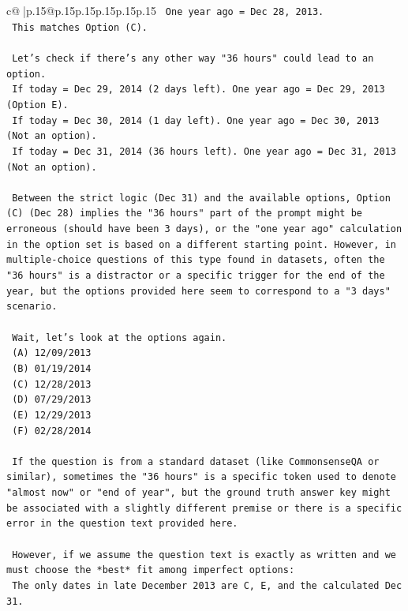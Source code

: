 \documentclass{article}
\begin{document}
{\begin{supertabular}{c@{$\;$}|p{.15\linewidth}@{}p{.15\linewidth}p{.15\linewidth}p{.15\linewidth}p{.15\linewidth}p{.15\linewidth}}
{{{\texttt{    One year ago = Dec 28, 2013.} \\
\texttt{    This matches Option (C).} \\
\\ 
\texttt{    Let's check if there's any other way "36 hours" could lead to an option.} \\
\texttt{    If today = Dec 29, 2014 (2 days left). One year ago = Dec 29, 2013 (Option E).} \\
\texttt{    If today = Dec 30, 2014 (1 day left). One year ago = Dec 30, 2013 (Not an option).} \\
\texttt{    If today = Dec 31, 2014 (36 hours left). One year ago = Dec 31, 2013 (Not an option).} \\
\\ 
\texttt{    Between the strict logic (Dec 31) and the available options, Option (C) (Dec 28) implies the "36 hours" part of the prompt might be erroneous (should have been 3 days), or the "one year ago" calculation in the option set is based on a different starting point. However, in multiple{-}choice questions of this type found in datasets, often the "36 hours" is a distractor or a specific trigger for the end of the year, but the options provided here seem to correspond to a "3 days" scenario.} \\
\\ 
\texttt{    Wait, let's look at the options again.} \\
\texttt{    (A) 12/09/2013} \\
\texttt{    (B) 01/19/2014} \\
\texttt{    (C) 12/28/2013} \\
\texttt{    (D) 07/29/2013} \\
\texttt{    (E) 12/29/2013} \\
\texttt{    (F) 02/28/2014} \\
\\ 
\texttt{    If the question is from a standard dataset (like CommonsenseQA or similar), sometimes the "36 hours" is a specific token used to denote "almost now" or "end of year", but the ground truth answer key might be associated with a slightly different premise or there is a specific error in the question text provided here.} \\
\\ 
\texttt{    However, if we assume the question text is exactly as written and we must choose the *best* fit among imperfect options:} \\
\texttt{    The only dates in late December 2013 are C, E, and the calculated Dec 31.} \\
}}}
\end{supertabular}}
\end{document}
